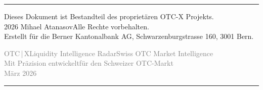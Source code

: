 \documentclass[12pt, a4paper, oneside]{report}
\begin{document}
\begin{center}
{\color{swissred}\rule{0.4\textwidth}{1pt}}

\vspace{0.5cm}
{\small\sffamily\textcolor{darknavy}{Dieses Dokument ist Bestandteil des propriet\"aren OTC-X Projekts.}}\\
{\small\sffamily\textcolor{darknavy}{\textcopyright{} 2026 Mihael Atanasov\;\textbullet\;Alle Rechte vorbehalten.}}\\
{\small\sffamily\textcolor{darknavy}{Erstellt f\"ur die Berner Kantonalbank AG, Schwarzenburgstrasse 160, 3001 Bern.}}

\vspace{0.3cm}
{\footnotesize\sffamily\textcolor{gray}{OTC\,|\,X\;\;\textbullet\;\;Liquidity Intelligence Radar\;\;\textbullet\;\;Swiss OTC Market Intelligence}}\\[4pt]
{\footnotesize\sffamily\textcolor{gray}{Mit Pr\"azision entwickelt\;\;\textbullet\;\;f\"ur den Schweizer OTC-Markt}}\\[4pt]
{\footnotesize\sffamily\textcolor{gray}{M\"arz 2026}}

\vspace{0.5cm}
{\color{swissred}\rule{0.4\textwidth}{1pt}}
\end{center}
\end{document}
